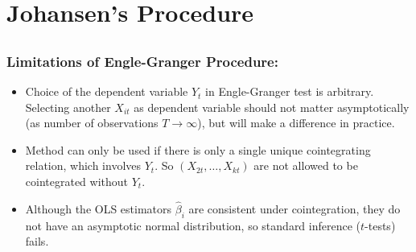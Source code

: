\section{Johansen's Procedure}\subsection*{}
\begin{frame}%

\frametitle{Limitations of Engle-Granger Procedure:}

\begin{itemize}
\item Choice of the dependent variable $Y_t$ in Engle-Granger test is arbitrary. Selecting another $X_{it}$ as dependent variable should not
matter asymptotically (as number of observations $T\rightarrow \infty $),
but will make a difference in practice.

\item Method can only be used if there is only a single unique cointegrating
relation, which involves $Y_{t}$. So $(X_{2t},\ldots ,X_{kt})$ are not
allowed to be cointegrated without $Y_{t}$.

\item Although the OLS estimators $\hat{\beta}_{i}$ are consistent under
cointegration, they do not have an asymptotic normal distribution, so
standard inference ($t$-tests) fails.
\end{itemize}

\end{frame}%


